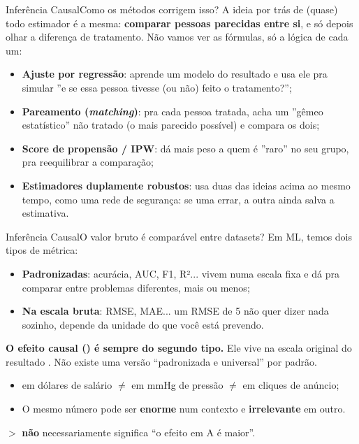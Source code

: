 \begin{frame}{Inferência Causal}{Como os métodos corrigem isso?}
    A ideia por trás de (quase) todo estimador é a mesma: \textbf{comparar pessoas parecidas entre si}, e só depois olhar a diferença de tratamento. Não vamos ver as fórmulas, só a lógica de cada um:

    \pause
    \begin{itemize}
        \item \textbf{Ajuste por regressão}: aprende um modelo do resultado e usa ele pra simular ''e se essa pessoa tivesse (ou não) feito o tratamento?'';
        \pause
        \item \textbf{Pareamento (\textit{matching})}: pra cada pessoa tratada, acha um ''gêmeo estatístico'' não tratado (o mais parecido possível) e compara os dois;
        \pause
        \item \textbf{Score de propensão / IPW}: dá mais peso a quem é ''raro'' no seu grupo, pra reequilibrar a comparação;
        \pause
        \item \textbf{Estimadores duplamente robustos}: usa duas das ideias acima ao mesmo tempo, como uma rede de segurança: se uma errar, a outra ainda salva a estimativa.
    \end{itemize}
\end{frame}

\begin{frame}{Inferência Causal}{O valor bruto é comparável entre datasets?}
    Em ML, temos dois tipos de métrica:
    \begin{itemize}
        \item \textbf{Padronizadas}: acurácia, AUC, F1, R²... vivem numa escala fixa e dá pra comparar entre problemas diferentes, mais ou menos;
        \pause
        \item \textbf{Na escala bruta}: RMSE, MAE... um RMSE de 5 não quer dizer nada sozinho, depende da unidade do que você está prevendo.
    \end{itemize}

    \pause
    \textbf{O efeito causal (\bm{$\tau$}) é sempre do segundo tipo.} Ele vive na escala original do resultado . Não existe uma versão ``padronizada e universal'' por padrão.

    \pause
    \begin{itemize}
        \item {} em dólares de salário $\neq$  em mmHg de pressão $\neq$  em cliques de anúncio;
        \pause
        \item O mesmo número pode ser \textbf{enorme} num contexto e \textbf{irrelevante} em outro.
    \end{itemize}

    \pause
     $>$  \textbf{não} necessariamente significa ``o efeito em A é maior''.
\end{frame}


